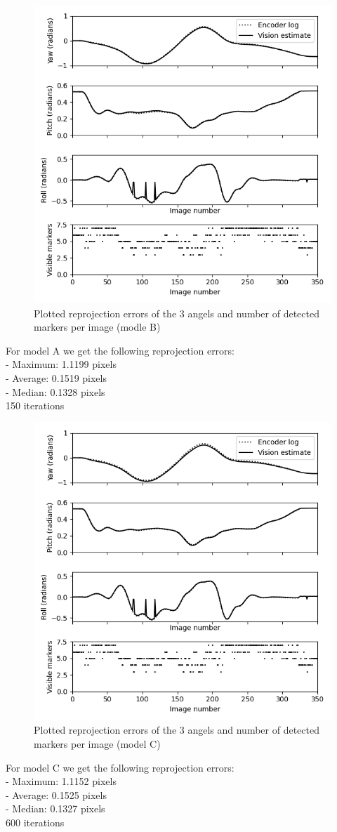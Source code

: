 \documentclass[a4paper]{article} %
\begin{document}
        \begin{figure}[h]
        \centering
        \includegraphics[width=0.5 \linewidth]{../python/out_part3_Mod-B}
        \caption{Plotted reprojection errors of the 3 angels and number of detected markers per image (modle B)}
    \end{figure}
    For model A we get the following reprojection errors: \\
    - Maximum: 1.1199 pixels \\
    - Average: 0.1519 pixels \\
    - Median: 0.1328 pixels \\
    150 iterations

        \begin{figure}[h]
        \centering
        \includegraphics[width=0.5 \linewidth]{../python/out_part3_Mod-C}
        \caption{Plotted reprojection errors of the 3 angels and number of detected markers per image (model C)}
    \end{figure}
    For model C we get the following reprojection errors: \\
    - Maximum: 1.1152 pixels\\
    - Average: 0.1525 pixels\\
    - Median: 0.1327 pixels \\
    600 iterations
\end{document}
